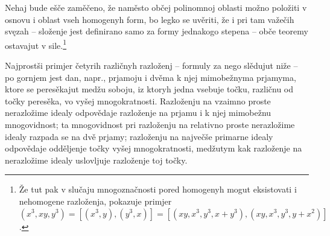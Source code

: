 \documentclass[11pt]{article}
\begin{document}
Nehaj bude ešče zaměčeno, že naměsto občej polinomnoj oblasti možno položiti v osnovu i oblast vseh homogenyh form, bo legko se uvěriti, že i pri tam važečih svęzah -- složenje jest definirano samo za formy jednakogo stepena -- obče teoremy ostavajut v sile.\footnote{Že tut pak v slučaju mnogoznačnosti pored homogenyh mogut eksistovati i nehomogene razloženja, pokazuje primjer \( (x^3,xy,y^3)=[(x^3,y),(y^3,x)]=[(xy,x^3,y^3,x+y^3),(xy,x^3,y^3,y+x^2)]\).}

Najprostši primjer četyrih različnyh razloženj -- formuly za nego slědujut niže -- po gornjem jest dan, napr., prjamoju i dvěma k njej mimobežnyma prjamyma, ktore se peresěkajut medžu soboju, iz ktoryh jedna vsebuje točku, različnu od točky peresěka, vo vyšej mnogokratnosti. Razloženju na vzaimno proste nerazložime idealy odpovědaje razloženje na prjamu i k njej mimobežnu mnogovidnost; ta mnogovidnost pri razloženju na relativno proste nerazložime idealy razpada se na dvě prjamy; razloženju na največše primarne idealy odpovědaje odděljenje točky vyšej mnogokratnosti, medžutym kak razloženje na nerazložime idealy uslovljuje razloženje toj točky.
\end{document}
